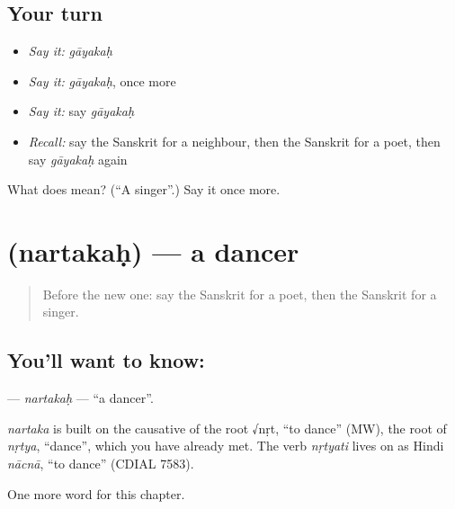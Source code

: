 \subsection*{Your turn}
\begin{itemize}
\raggedright
  \item \emph{Say it:} \emph{gāyakaḥ}
  \item \emph{Say it:} \emph{gāyakaḥ}, once more
  \item \emph{Say it:} say \emph{gāyakaḥ}
  \item \emph{Recall:} say the Sanskrit for a neighbour, then the Sanskrit for a poet, then say \emph{gāyakaḥ} again
\end{itemize}

\begin{tcolorbox}[breakable,colback=teal!4,colframe=teal!35!black,title={Before you move on}]
What does  mean? (\textquotedblleft{}A singer\textquotedblright{}.) Say it once more.
\end{tcolorbox}
\section[\texorpdfstring{\sk{नर्तकः} (nartakaḥ)}{नर्तकः (nartakaḥ)}]{ (nartakaḥ) — a dancer}

\label{lesson:SA-C209-nartakah}



\begin{quote}
Before the new one: say the Sanskrit for a poet, then the Sanskrit for a singer.
\end{quote}

\subsection*{You'll want to know: }
\textbf{} — \emph{nartakaḥ} — \textquotedblleft{}a dancer\textquotedblright{}.

\begin{cousinweb}
\emph{nartaka} is built on the causative of the root √nṛt, \textquotedblleft{}to dance\textquotedblright{} (MW), the root of \emph{nṛtya}, \textquotedblleft{}dance\textquotedblright{}, which you have already met. The verb \emph{nṛtyati} lives on as Hindi \emph{nācnā}, \textquotedblleft{}to dance\textquotedblright{} (CDIAL 7583).
\end{cousinweb}

\begin{grammarlens}[title={What you've built}]
One more word for this chapter.
\end{grammarlens}

